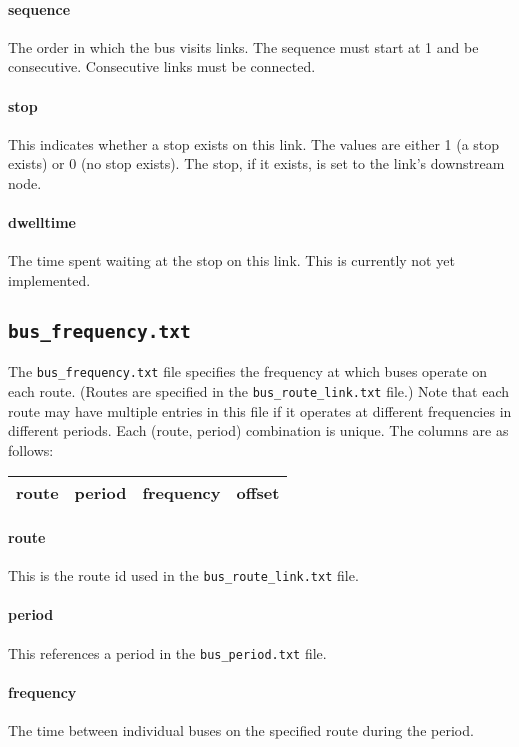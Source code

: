 \paragraph*{sequence} The order in which the bus visits links. The sequence must start at 1 and be consecutive. Consecutive links must be connected.
\paragraph*{stop} This indicates whether a stop exists on this link. The values are either 1 (a stop exists) or 0 (no stop exists). The stop, if it exists, is set to the link's downstream node.
\paragraph*{dwelltime} The time spent waiting at the stop on this link. This is currently not yet implemented.

\subsection{\texttt{bus\_frequency.txt}}
The \texttt{bus\_frequency.txt} file specifies the frequency at which buses operate on each route. (Routes are specified in the \texttt{bus\_route\_link.txt} file.) Note that each route may have multiple entries in this file if it operates at different frequencies in different periods. Each (route, period) combination is unique. The columns are as follows:
\begin{center}
\begin{tabular}{cccc}
\hline
route & period & frequency & offset\\\hline
\end{tabular}
\end{center}
\paragraph*{route} This is the route id used in the \texttt{bus\_route\_link.txt} file.
\paragraph*{period} This references a period in the \texttt{bus\_period.txt} file.
\paragraph*{frequency} The time between individual buses on the specified route during the period.
